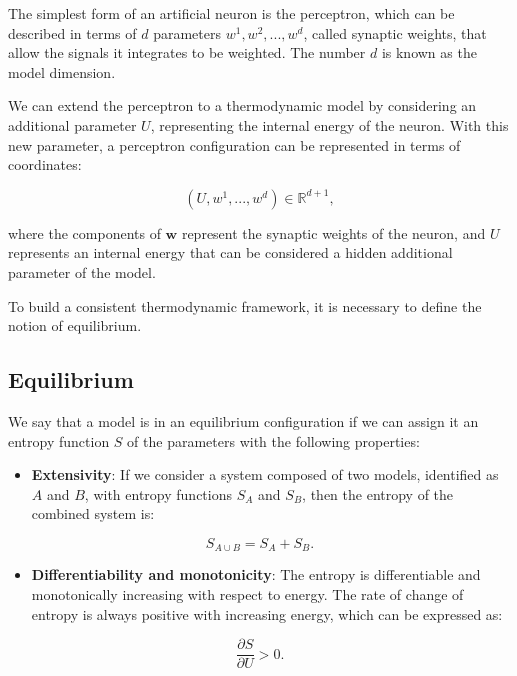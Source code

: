 \documentclass[12pt]{article}
\begin{document}
The simplest form of an artificial neuron is the perceptron, which can be described in terms of $d$ parameters $w^1, w^2, ..., w^d$, called synaptic weights, that allow the signals it integrates to be weighted. The number $d$ is known as the model dimension.

We can extend the perceptron to a thermodynamic model by considering an additional parameter $U$, representing the internal energy of the neuron. With this new parameter, a perceptron configuration can be represented in terms of coordinates:

\begin{equation}
(U, w^1, ..., w^d) \in \mathbb{R}^{d+1},
\end{equation}

where the components of $\mathbf{w}$ represent the synaptic weights of the neuron, and $U$ represents an internal energy that can be considered a hidden additional parameter of the model.

To build a consistent thermodynamic framework, it is necessary to define the notion of equilibrium.
\subsection*{Equilibrium}

We say that a model is in an equilibrium configuration if we can assign it an entropy function $S$ of the parameters with the following properties:

\begin{itemize}
  \item \textbf{Extensivity}: If we consider a system composed of two models, identified as $A$ and $B$, with entropy functions $S_A$ and $S_B$, then the entropy of the combined system is:
\end{itemize}
\begin{equation}
S_{A \cup B} = S_A + S_B.
\end{equation}

\begin{itemize}
  \item \textbf{Differentiability and monotonicity}: The entropy is differentiable and monotonically increasing with respect to energy. The rate of change of entropy is always positive with increasing energy, which can be expressed as:
\end{itemize}
\begin{equation}
\frac{\partial S}{\partial U} > 0.
\end{equation}
\end{document}

